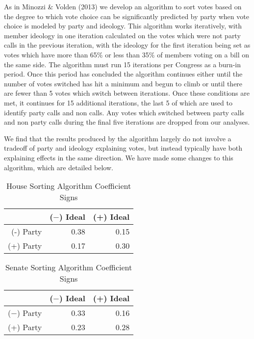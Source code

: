 \documentclass[12pt]{article}
\begin{document}
As in Minozzi \& Volden (2013) we develop an algorithm to sort votes based on the degree to which vote choice can be significantly predicted by party when vote choice is modeled by party and ideology. This algorithm works iteratively, with member ideology in one iteration calculated on the votes which were not party calls in the previous iteration, with the ideology for the first iteration being set as votes which have more than 65\% or less than 35\% of members voting on a bill on the same side. The algorithm must run 15 iterations per Congress as a burn-in period. Once this period has concluded the algorithm continues either until the number of votes switched has hit a minimum and begun to climb or until there are fewer than 5 votes which switch between iterations. Once these conditions are met, it continues for 15 additional iterations, the last 5 of which are used to identify party calls and non calls. Any votes which switched between party calls and non party calls during the final five iterations are dropped from our analyses.

We find that the results produced by the algorithm largely do not involve a tradeoff of party and ideology explaining votes, but instead typically have both explaining effects in the same direction. We have made some changes to this algorithm, which are detailed below.

\begin{table}[H]
	\centering
	\caption{House Sorting Algorithm Coefficient Signs}
	\begin{tabular}{rrr}
		\hline
		& ($-$) Ideal & (+) Ideal \\ 
		\hline
		(-) Party & 0.38 & 0.15 \\ 
		(+) Party & 0.17 & 0.30 \\ 
		\hline
	\end{tabular}
\end{table}

\begin{table}[H]
	\centering
	\caption{Senate Sorting Algorithm Coefficient Signs}
	\begin{tabular}{rrr}
		\hline
		& ($-$) Ideal & (+) Ideal \\ 
		\hline
		($-$) Party & 0.33 & 0.16 \\ 
		(+) Party & 0.23 & 0.28 \\ 
		\hline
	\end{tabular}
\end{table}
\end{document}
